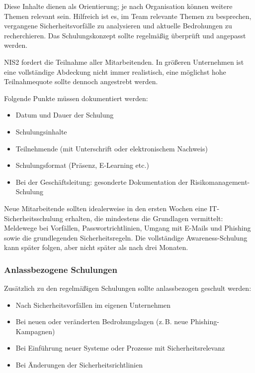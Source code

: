 Diese Inhalte dienen als Orientierung; je nach Organisation können weitere Themen relevant sein. Hilfreich ist es, im Team relevante Themen zu besprechen, vergangene Sicherheitsvorfälle zu analysieren und aktuelle Bedrohungen zu recherchieren. Das Schulungskonzept sollte regelmäßig überprüft und angepasst werden.

NIS2 fordert die Teilnahme aller Mitarbeitenden. In größeren Unternehmen ist eine vollständige Abdeckung nicht immer realistisch, eine möglichst hohe Teilnahmequote sollte dennoch angestrebt werden.

Folgende Punkte müssen dokumentiert werden:
\begin{itemize}
    \item Datum und Dauer der Schulung
    \item Schulungsinhalte
    \item Teilnehmende (mit Unterschrift oder elektronischem Nachweis)
    \item Schulungsformat (Präsenz, E-Learning etc.)
    \item Bei der Geschäftsleitung: gesonderte Dokumentation der Risikomanagement-Schulung
\end{itemize}

Neue Mitarbeitende sollten idealerweise in den ersten Wochen eine IT-Sicherheitsschulung erhalten, die mindestens die Grundlagen vermittelt: Meldewege bei Vorfällen, Passwortrichtlinien, Umgang mit E-Mails und Phishing sowie die grundlegenden Sicherheitsregeln. Die vollständige Awareness-Schulung kann später folgen, aber nicht später als nach drei Monaten.

\subsubsection{Anlassbezogene Schulungen}

Zusätzlich zu den regelmäßigen Schulungen sollte anlassbezogen geschult werden:

\begin{itemize}
    \item Nach Sicherheitsvorfällen im eigenen Unternehmen
    \item Bei neuen oder veränderten Bedrohungslagen (z.\,B. neue Phishing-Kampagnen)
    \item Bei Einführung neuer Systeme oder Prozesse mit Sicherheitsrelevanz
    \item Bei Änderungen der Sicherheitsrichtlinien
\end{itemize}


